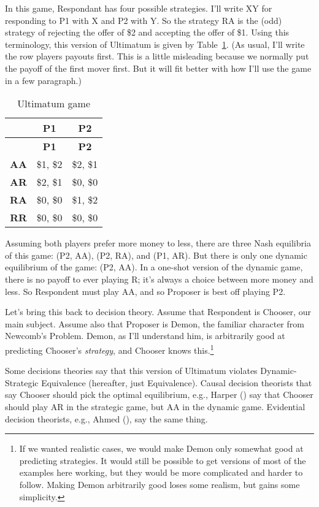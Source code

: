 \documentclass[
  10pt,
  letterpaper,
  DIV=11,
  numbers=noendperiod,
  twoside]{scrartcl}
\begin{document}
In this game, Respondant has four possible strategies. I'll write XY for
responding to P1 with X and P2 with Y. So the strategy RA is the (odd)
strategy of rejecting the offer of \$2 and accepting the offer of \$1.
Using this terminology, this version of Ultimatum is given by
Table~\ref{tbl-ultimatum}. (As usual, I'll write the row players payouts
first. This is a little misleading because we normally put the payoff of
the first mover first. But it will fit better with how I'll use the game
in a few paragraph.)

\begin{longtable}[]{@{}rcc@{}}
\caption{Ultimatum game}\label{tbl-ultimatum}\tabularnewline
\toprule\noalign{}
& \textbf{P1} & \textbf{P2} \\
\midrule\noalign{}
\endfirsthead
\toprule\noalign{}
& \textbf{P1} & \textbf{P2} \\
\midrule\noalign{}
\endhead
\bottomrule\noalign{}
\endlastfoot
\textbf{AA} & \$1, \$2 & \$2, \$1 \\
\textbf{AR} & \$2, \$1 & \$0, \$0 \\
\textbf{RA} & \$0, \$0 & \$1, \$2 \\
\textbf{RR} & \$0, \$0 & \$0, \$0 \\
\end{longtable}

Assuming both players prefer more money to less, there are three Nash
equilibria of this game: (P2, AA), (P2, RA), and (P1, AR). But there is
only one dynamic equilibrium of the game: (P2, AA). In a one-shot
version of the dynamic game, there is no payoff to ever playing R; it's
always a choice between more money and less. So Respondent must play AA,
and so Proposer is best off playing P2.

Let's bring this back to decision theory. Assume that Respondent is
Chooser, our main subject. Assume also that Proposer is Demon, the
familiar character from Newcomb's Problem. Demon, as I'll understand
him, is arbitrarily good at predicting Chooser's \emph{strategy}, and
Chooser knows this.\footnote{If we wanted realistic cases, we would make
  Demon only somewhat good at predicting strategies. It would still be
  possible to get versions of most of the examples here working, but
  they would be more complicated and harder to follow. Making Demon
  arbitrarily good loses some realism, but gains some simplicity.}

Some decisions theories say that this version of Ultimatum violates
Dynamic-Strategic Equivalence (hereafter, just Equivalence). Causal
decision theorists that say Chooser should pick the optimal equilibrium,
e.g., Harper () say that Chooser should
play AR in the strategic game, but AA in the dynamic game. Evidential
decision theorists, e.g., Ahmed (), say
the same thing.
\end{document}
